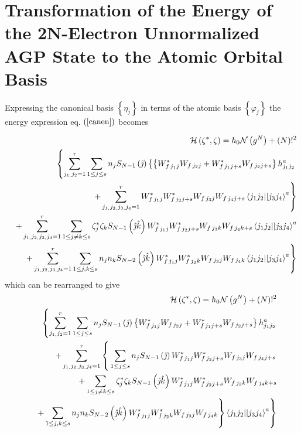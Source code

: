 \documentclass{article}
\begin{document}
\section{Transformation of the Energy of the 2N-Electron Unnormalized AGP
State to the Atomic Orbital Basis \label{aoen}}

Expressing the canonical basis $\left\{ \eta _{j}\right\} $ in terms of the
atomic basis $\left\{ \varphi _{j}\right\} $ the energy expression eq. $%
\left( \ref{canen}\right) $ becomes

\begin{eqnarray}
&&\mathcal{H}\left( \mathbf{\zeta }^{\ast },\mathbf{\zeta }\right) =h_{0}%
\mathcal{N}\left( g^{N}\right) +\left( N\right) !^{2}  \notag \\
&&\left\{ \sum_{j_{1,}j_{2}=1}^{r}\sum_{1\leq j\leq s}n_{j}S_{N-1}\left( 
\hat{\jmath}\right) \left\{ \left\{ W_{f\,j_{1}j}^{\ast
}W_{f\,j_{2}j}+W_{f\,j_{1}j+s}^{\ast }W_{f\,j_{2}j+s}\right\}
h_{j_{1}j_{2}}^{a}\right. \right.  \notag \\
&&\qquad \qquad \qquad \qquad \left.
+\sum_{j_{1,}j_{2,}j_{3,}j_{4}=1}^{r}W_{f\,j_{1}j}^{\ast
}W_{f\,j_{2}j+s}^{\ast }W_{f\,j_{3}j}W_{f\,j_{4}j+s}\left\langle
j_{1}j_{2}||j_{3}j_{4}\right\rangle ^{a}\right\}  \notag \\
&&+\sum_{j_{1,}j_{2,}j_{3,}j_{4}=1}^{r}\sum_{1\leq j\neq k\leq s}\zeta
_{j}^{\ast }\zeta _{k}S_{N-1}\left( \hat{\jmath}\hat{k}\right)
W_{f\,j_{1}j}^{\ast }W_{f\,j_{2}j+s}^{\ast
}W_{f\,j_{3}k}W_{f\,j_{4}k+s}\left\langle
j_{1}j_{2}||j_{3}j_{4}\right\rangle ^{a}  \notag \\
&&\left. +\sum_{j_{1,}j_{2,}j_{3,}j_{4}=1}^{r}\sum_{1\leq j,k\leq
s}n_{j}n_{k}S_{N-2}\left( \hat{\jmath}\hat{k}\right) W_{f\,j_{1}j}^{\ast
}W_{f\,j_{2}k}^{\ast }W_{f\,j_{3}j}W_{f\,j_{4}k}\left\langle
j_{1}j_{2}||j_{3}j_{4}\right\rangle ^{a}\right\}
\end{eqnarray}%
which can be rearranged to give 
\begin{eqnarray}
&&\mathcal{H}\left( \mathbf{\zeta }^{\ast },\mathbf{\zeta }\right) =h_{0}%
\mathcal{N}\left( g^{N}\right) +\left( N\right) !^{2}  \notag \\
&&\left\{ \sum_{j_{1,}j_{2}=1}^{r}\sum_{1\leq j\leq s}n_{j}S_{N-1}\left( 
\hat{\jmath}\right) \left\{ W_{f\,j_{1}j}^{\ast
}W_{f\,j_{2}j}+W_{f\,j_{1}j+s}^{\ast }W_{f\,j_{2}j+s}\right\}
h_{j_{1}j_{2}}^{a}\right.  \notag \\
&&+\sum_{j_{1,}j_{2,}j_{3,}j_{4}=1}^{r}\left\{ \overset{}{\underset{}{}}%
\sum_{1\leq j\leq s}n_{j}S_{N-1}\left( \hat{\jmath}\right)
W_{f\,j_{1}j}^{\ast }W_{f\,j_{2}j+s}^{\ast
}W_{f\,j_{3}j}W_{f\,j_{4}j+s}\right.  \notag \\
&&+\sum_{1\leq j\neq k\leq s}\zeta _{j}^{\ast }\zeta _{k}S_{N-1}\left( \hat{%
\jmath}\hat{k}\right) W_{f\,j_{1}j}^{\ast }W_{f\,j_{2}j+s}^{\ast
}W_{f\,j_{3}k}W_{f\,j_{4}k+s}  \notag \\
&&\left. \left. +\sum_{1\leq j,k\leq s}n_{j}n_{k}S_{N-2}\left( \hat{\jmath}%
\hat{k}\right) W_{f\,j_{1}j}^{\ast }W_{f\,j_{2}k}^{\ast
}W_{f\,j_{3}j}W_{f\,j_{4}k}\right\} \left\langle
j_{1}j_{2}||j_{3}j_{4}\right\rangle ^{a}\right\}
\end{eqnarray}
\end{document}
